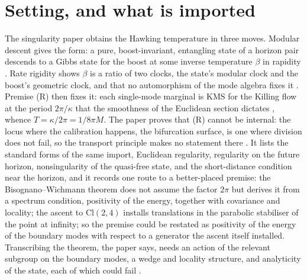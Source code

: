 \documentclass[11pt]{article}
\theoremstyle{definition}
\theoremstyle{plain}
\providecommand{\Cl}{}\renewcommand{\Cl}{\mathrm{Cl}}
\begin{document}
\noindent{}
\newpage

\section{Setting, and what is imported}

\label{c:note.angle.setting-setting-what-imported}
The singularity paper obtains the Hawking temperature in three moves. Modular descent gives the form: a pure, boost-invariant, entangling state of a horizon pair descends to a Gibbs state for the boost at some inverse temperature $\beta$ in rapidity \cite[Thm.~7.3]{ButlerT5}. Rate rigidity shows $\beta$ is a ratio of two clocks, the state's modular clock and the boost's geometric clock, and that no automorphism of the mode algebra fixes it \cite[Thm.~7.16]{ButlerT5}. Premise (R) then fixes it: each single-mode marginal is KMS for the Killing flow at the period $2\pi/\kappa$ that the smoothness of the Euclidean section dictates \cite[Prop.~7.18, Prem.~7.19]{ButlerT5}, whence $T = \kappa/2\pi = 1/8\pi M$. The paper proves that (R) cannot be internal: the locus where the calibration happens, the bifurcation surface, is one where division does not fail, so the transport principle makes no statement there \cite[Prop.~7.25]{ButlerT5}. It lists the standard forms of the same import, Euclidean regularity, regularity on the future horizon, nonsingularity of the quasi-free state, and the short-distance condition near the horizon, and it records one route to a better-placed premise: the Bisognano--Wichmann theorem does not assume the factor $2\pi$ but derives it from a spectrum condition, positivity of the energy, together with covariance and locality; the ascent to $\Cl(2,4)$ installs translations in the parabolic stabiliser of the point at infinity; so the premise could be restated as positivity of the energy of the boundary modes with respect to a generator the ascent itself installed. Transcribing the theorem, the paper says, needs an action of the relevant subgroup on the boundary modes, a wedge and locality structure, and analyticity of the state, each of which could fail \cite[Rem.~7.26, Rem.~7.33(a)]{ButlerT5}.
\end{document}

